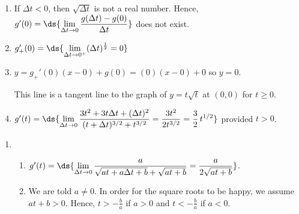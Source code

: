 \documentclass{ximera}
\begin{document}
\begin{enumerate}
\begin{enumerate}
\item  If $\Delta t < 0$, then $\sqrt{\Delta t}$ is not a real number.  Hence, $g'(0) = \ds{\lim_{\Delta t \rightarrow 0} \dfrac{g(\Delta t) - g(0)}{\Delta t}}$ does not exist.

\item  $g_{+}'(0) =\ds{ \lim_{\Delta t \rightarrow 0^{+}} (\Delta t)^{\frac{1}{2}}   =  0}$

\smallskip

\item  $y = g_{+}'(0) (x - 0) + g(0) =  (0) (x-0) + 0$ so $y = 0$.  

\smallskip

This line is a tangent line to the graph of $y = t \sqrt{t}$ at $(0,0)$ for $t \geq 0$.

\smallskip

\item  $g'(t) =\ds{ \lim_{\Delta t \rightarrow 0}\dfrac{3t^2+3t\Delta t+(\Delta t)^2}{(t+\Delta t)^{3/2} + t^{3/2}} = \dfrac{3t^2}{2 t^{3/2}} = \dfrac{3}{2} \, t^{1/2}}$ provided $t > 0$.


\end{enumerate}


\setcounter{HW}{\value{enumi}}
\end{enumerate}

\begin{enumerate}
\setcounter{enumi}{\value{HW}}

\item  \begin{enumerate} \item  $g'(t) = \ds{ \lim_{\Delta t \rightarrow 0} \dfrac{a}{\sqrt{at+a\Delta t+b} + \sqrt{at+b}} = \dfrac{a}{2 \sqrt{at+b}} }$.  

\smallskip

\item  We are told $a \neq 0$.  In order for the square roots to be happy, we assume $at + b > 0$.  Hence,   $t >  - \frac{b}{a}$ if $a>0$ and $t < -  \frac{b}{a}$ if $a<0$. 

\end{enumerate}

\setcounter{HW}{\value{enumi}}
\end{enumerate}
\end{document}
